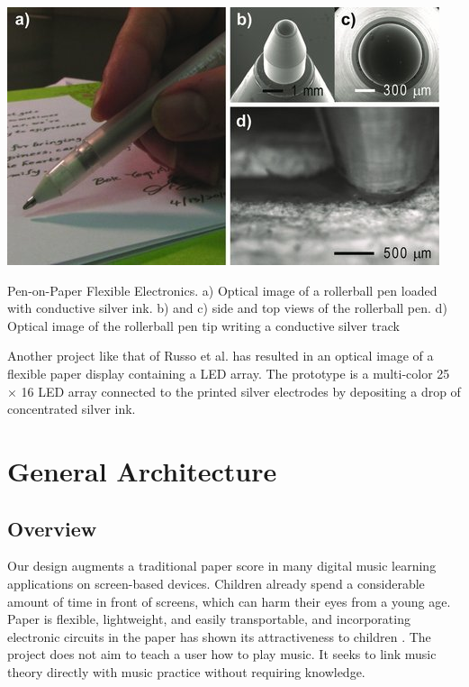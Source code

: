 \begin{marginfigure}
   \centering
   \includegraphics{images/IS_pen-on-paper.jpg}
   \caption{Pen-on-Paper Flexible Electronics. a) Optical image of a rollerball pen loaded with conductive silver ink. b) and c) side and top views of the rollerball pen. d) Optical image of the rollerball pen tip writing a conductive silver track}
   \label{fig:IS_pen-on-paper}
\end{marginfigure}

Another project like that of Russo et al. \cite{russo2011pen} has resulted in an optical image of a flexible paper display containing a LED array. The prototype is a multi-color 25 × 16 LED array connected to the printed silver electrodes by depositing a drop of concentrated silver ink.

\section{General Architecture}

\subsection{Overview}

Our design augments a traditional paper score in many digital music learning applications on screen-based devices. Children already spend a considerable amount of time in front of screens, which can harm their eyes from a young age. Paper is flexible, lightweight, and easily transportable, and incorporating electronic circuits in the paper has shown its attractiveness to children \cite{hershman2018light}. The project does not aim to teach a user how to play music. It seeks to link music theory directly with music practice without requiring knowledge.

